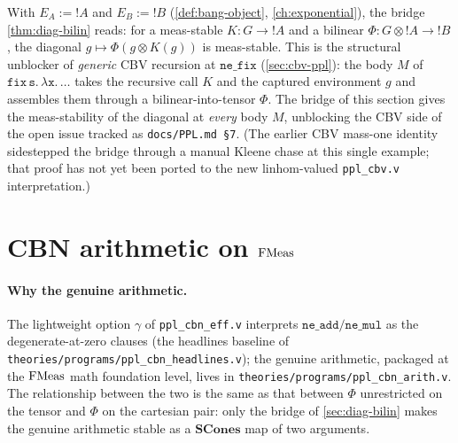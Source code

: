 \begin{remark}
With $E_A := \mathord{!}A$ and $E_B := \mathord{!}B$
(\autoref{def:bang-object}, \autoref{ch:exponential}), the bridge
\autoref{thm:diag-bilin} reads: for a meas-stable
$K : G \to \mathord{!}A$ and a bilinear
$\Phi : G \otimes \mathord{!}A \to \mathord{!}B$, the diagonal
$g \mapsto \Phi(g \otimes K(g))$ is meas-stable. This is the structural
unblocker of \emph{generic} CBV recursion at $\mathtt{ne\_fix}$
(\autoref{sec:cbv-ppl}): the body $M$ of
$\mathtt{fix\,s.\,\lambda x.\,\ldots}$ takes the recursive call
$K$ and the captured environment $g$ and assembles them through a
bilinear-into-tensor $\Phi$. The bridge of this section gives the
meas-stability of the diagonal at \emph{every} body $M$, unblocking
the CBV side of the open issue tracked as \texttt{docs/PPL.md \S 7}.
(The earlier CBV mass-one identity sidestepped the bridge through a
manual Kleene chase at this single example; that proof has not yet
been ported to the new linhom-valued \texttt{ppl\_cbv.v}
interpretation.)
\end{remark}

\section{CBN arithmetic on
\texorpdfstring{$\mathrm{FMeas}$}{FMeas}}\label{sec:cbn-arith}

\paragraph{Why the genuine arithmetic.}
The lightweight option $\gamma$ of \texttt{ppl\_cbn\_eff.v} interprets
$\mathtt{ne\_add}/\mathtt{ne\_mul}$ as the degenerate-at-zero clauses
(the headlines baseline of
\texttt{theories/programs/ppl\_cbn\_headlines.v}); the genuine
arithmetic, packaged at the $\mathrm{FMeas}$ math foundation level, lives in
\texttt{theories/programs/ppl\_cbn\_arith.v}. The relationship between
the two is the same as that between $\Phi$ unrestricted on the tensor
and $\Phi$ on the cartesian pair: only the bridge of
\autoref{sec:diag-bilin} makes the genuine arithmetic stable as a
$\mathbf{SCones}$ map of two arguments.

